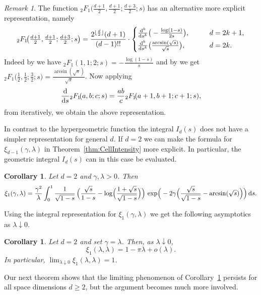 \documentclass[11pt,a4paper]{article}
\theoremstyle{plain}
\newtheorem{corollary}[theorem]{Corollary}
\theoremstyle{definition}
\theoremstyle{remark}
\newtheorem{remark}[theorem]{Remark}
\newcommand{\dint}{\textup{d}}
\begin{document}
\begin{remark}\label{rem:Hypergeometric}
	The function ${}_2F_1\!\big(\tfrac{d+1}{2},\tfrac{d+1}{2};\tfrac{d+3}{2};s\big)$ has an alternative more explicit representation, namely
	\[
		{}_2F_1\!\big(\tfrac{d+1}{2},\tfrac{d+1}{2};\tfrac{d+3}{2};s\big)=\frac{2^{\lfloor \frac{d}{2}\rfloor}(d+1)}{(d-1)!!}\cdot\begin{cases}
			\frac{\dint^k}{\dint s^k}\big(-\frac{\log(1-s)}{2s}\big),\qquad              & d=2k+1, \\[0.1cm]
			\frac{\dint^k}{\dint s^k}\big(\frac{\arcsin(\sqrt{s})}{\sqrt{s}}\big),\qquad & d=2k.
		\end{cases}
	\]
	Indeed by \cite[Equation 15.4.1]{NIST} we have ${}_2F_1\!(1,1;2;s)=-\frac{\log(1-s)}{s}$ and by \cite[Equation 15.4.4]{NIST} we get ${}_2F_1\!\big(\frac{1}{2},\frac{1}{2};\frac{3}{2};s\big)=\frac{\arcsin(\sqrt{s})}{\sqrt{s}}$. Now applying
	\[
		\frac{\dint}{\dint s}{}_2F_1\!(a,b;c;s)=\frac{ab}{c}{}_2F_1\!(a+1,b+1;c+1;s),
	\]
	from \cite[Equation 15.5.1]{NIST} iteratively, we obtain the above representation.
\end{remark}

In contrast to the hypergeometric function the integral $I_d(s)$ does not have a simpler representation for general $d$. If $d=2$ we can make the formula for $\xi_{d-1}(\gamma,\lambda)$ in Theorem~\ref{thm:CellIntensity} more explicit. In particular, the geometric integral $I_d(s)$ can in this case be evaluated.

\begin{corollary}\label{cor:CellIntensity_d2}
	Let $d=2$ and $\gamma,\lambda>0$. Then
	\[
		\xi_1(\gamma,\lambda)
		=\frac{\gamma^2}{\lambda}
		\int_0^1 \frac{1}{\sqrt{1-s}}\,
		\Big(\frac{\sqrt{s}}{1-s}-\log\!\Big(\frac{1+\sqrt{s}}{\sqrt{1-s}}\Big)\Big)\,
		\exp\!\Big(
		-2\gamma\Big(\frac{\sqrt{s}}{\sqrt{1-s}}-\arcsin(\sqrt{s})\Big)
		\Big)\,\dint s.
	\]
\end{corollary}

Using the integral representation for $\xi_1(\gamma,\lambda)$ we get the following asymptotics as $\lambda\downarrow 0$.

\begin{corollary}\label{cor:lambda_asymptotics_d2}
	Let $d=2$ and set $\gamma=\lambda$. Then, as $\lambda\downarrow 0$,
	\[
		\xi_1(\lambda,\lambda)
		=1-\pi\lambda+o(\lambda).
	\]
	In particular, $\lim_{\lambda\downarrow 0}\xi_1(\lambda,\lambda)=1$.
\end{corollary}

Our next theorem shows that the limiting phenomenon of Corollary~\ref{cor:lambda_asymptotics_d2} persists for all space dimensions $d\geq 2$, but the argument becomes much more involved.
\end{document}
